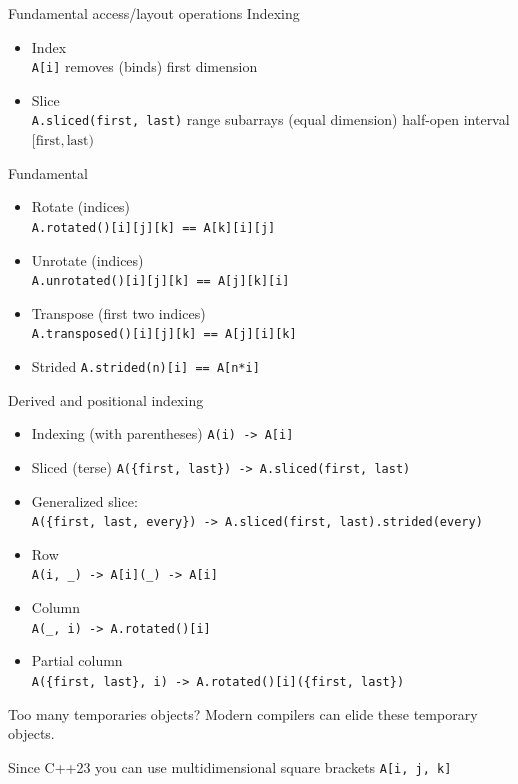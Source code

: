 \documentclass[t,aspectratio=169,handout]{beamer}
\begin{document}
\begin{frame}[fragile,label=basic4]{Fundamental access/layout operations}
Indexing
\begin{itemize}
\item Index\\
  \lstinline|A[i]| removes (binds) first dimension
\item Slice\\
  \lstinline|A.sliced(first, last)| range subarrays (equal dimension) half-open interval \([\mathrm{first}, \mathrm{last}) \)
\end{itemize}

Fundamental
\begin{itemize}
\item Rotate (indices) \\
  \lstinline|A.rotated()[i][j][k] == A[k][i][j]|
\item Unrotate (indices) \\
  \lstinline|A.unrotated()[i][j][k] == A[j][k][i]|
\item Transpose (first two indices) \\
  \lstinline|A.transposed()[i][j][k] == A[j][i][k]|
\item Strided
  \lstinline|A.strided(n)[i] == A[n*i]|
\end{itemize}
\end{frame}

\begin{frame}[fragile,label=basic5]{Derived and positional indexing}
\begin{itemize}
  \item Indexing (with parentheses)
    \lstinline|A(i) -> A[i]|
  \item Sliced (terse)
    \lstinline|A({first, last}) -> A.sliced(first, last)|
  \item Generalized slice:\\
    \lstinline|A({first, last, every}) -> A.sliced(first, last).strided(every)|
  \item Row\\
    \lstinline|A(i, _) -> A[i](_) -> A[i]| \\
  \item Column\\
    \lstinline|A(_, i) -> A.rotated()[i]| \\
  \item Partial column\\
    \lstinline|A({first, last}, i) -> A.rotated()[i]({first, last})| \\
\end{itemize}

\begin{block}{Too many temporaries objects?}
Modern compilers can elide these temporary objects.
\end{block}

\begin{alertblock}{}
  Since C++23 you can use multidimensional square brackets \lstinline|A[i, j, k]|
\end{alertblock}
\end{frame}
\end{document}
